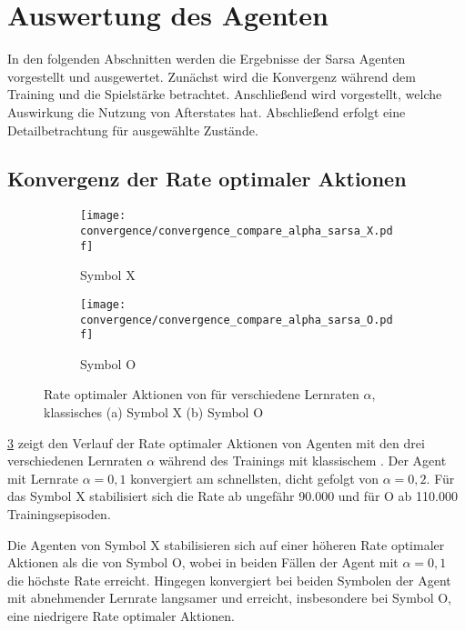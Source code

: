 \section{Auswertung des \sarsa Agenten}
In den folgenden Abschnitten werden die Ergebnisse der Sarsa Agenten vorgestellt und ausgewertet. Zunächst wird die Konvergenz während dem Training und die Spielstärke betrachtet. Anschließend wird vorgestellt, welche Auswirkung die Nutzung von Afterstates hat. Abschließend erfolgt eine Detailbetrachtung für ausgewählte Zustände.
\subsection{Konvergenz der Rate optimaler Aktionen}

\begin{figure}
\centering
\begin{subfigure}[b]{0.75\textwidth}
    \centering
   \texttt{[image: convergence/convergence\_compare\_alpha\_sarsa\_X.pdf]}
   \caption{Symbol X}
   \label{fig:convergence_compare_alpha_sarsa_X} 
\end{subfigure}

\begin{subfigure}[b]{0.75\textwidth}
    \centering
   \texttt{[image: convergence/convergence\_compare\_alpha\_sarsa\_O.pdf]}
   \caption{Symbol O}
   \label{fig:convergence_compare_alpha_sarsa_O}
\end{subfigure}

\caption[Rate optimaler Aktionen \sarsa unterschiedliche Lernraten, klassisches \splay]{Rate optimaler Aktionen von \sarsa für verschiedene Lernraten $\alpha$, klassisches \splay (a) Symbol X (b) Symbol O}
\label{fig:convergence_compare_alpha_sarsa}
\end{figure}

\cref{fig:convergence_compare_alpha_sarsa} zeigt den Verlauf der Rate optimaler Aktionen von \sarsa Agenten mit den drei verschiedenen Lernraten $\alpha$ während des Trainings mit klassischem \splay. 
Der Agent mit Lernrate $\alpha=0,1$ konvergiert am schnellsten, dicht gefolgt von $\alpha=0,2$. 
Für das Symbol X stabilisiert sich die Rate ab ungefähr 90.000 und für O ab 110.000 Trainingsepisoden. 

Die Agenten von Symbol X stabilisieren sich auf einer höheren Rate optimaler Aktionen als die von Symbol O, wobei in beiden Fällen der Agent mit $\alpha=0,1$ die höchste Rate erreicht. 
Hingegen konvergiert bei beiden Symbolen der Agent mit abnehmender Lernrate langsamer und erreicht, insbesondere bei Symbol O, eine niedrigere Rate optimaler Aktionen.

